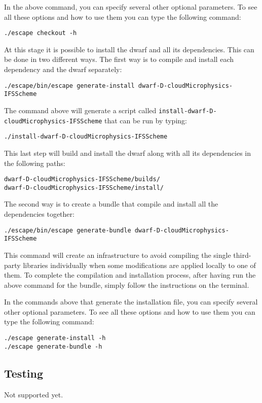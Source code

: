 \documentclass[
a4paper,     %
12pt,        %
article,
onecolumn,   %
openany,     %
]{memoir}
\newcommand{\inlsh}[1]{\texttt{#1}}
\newcommand{\inlsh}[1]{\tikz[anchor=base,baseline]\node[inner sep=2pt,
outer sep=0,draw=yellow!10,fill=yellow!10]{\texttt{#1}};}
\begin{document}
In the above command, you can specify several other optional 
parameters. To see all these options and how to use them you 
can type the following command:
%
\begin{lstlisting}[style=BashStyle]
./escape checkout -h
\end{lstlisting}
%

At this stage it is possible to install the dwarf 
and all its dependencies. This can be done in two 
different ways. The first way is to compile and 
install each dependency and the dwarf separately:
%
\begin{lstlisting}[style=BashStyle]
./escape/bin/escape generate-install dwarf-D-cloudMicrophysics-IFSScheme
\end{lstlisting}
% 
The command above will generate a script 
called \inlsh{install-dwarf-D-cloudMicrophysics-IFSScheme} 
that can be run by typing:
%
\begin{lstlisting}[style=BashStyle]
./install-dwarf-D-cloudMicrophysics-IFSScheme
\end{lstlisting}
%
This last step will build and install the dwarf 
along with all its dependencies in the following 
paths:
%
\begin{lstlisting}[style=BashStyle]
dwarf-D-cloudMicrophysics-IFSScheme/builds/
dwarf-D-cloudMicrophysics-IFSScheme/install/
\end{lstlisting}
%

The second way is to create a bundle that compile 
and install all the dependencies together:
%
\begin{lstlisting}[style=BashStyle]
./escape/bin/escape generate-bundle dwarf-D-cloudMicrophysics-IFSScheme
\end{lstlisting}
% 
This command will create an infrastructure to avoid
compiling the single third-party libraries individually
when some modifications are applied locally to one of 
them. To complete the compilation and installation process, 
after having run the above command for the bundle, simply 
follow the instructions on the terminal.

In the commands above that generate the installation 
file, you can specify several other optional parameters. 
To see all these options and how to use them you 
can type the following command:
%
\begin{lstlisting}[style=BashStyle]
./escape generate-install -h
./escape generate-bundle -h
\end{lstlisting}
%

\subsection{Testing}
Not supported yet.
\end{document}

